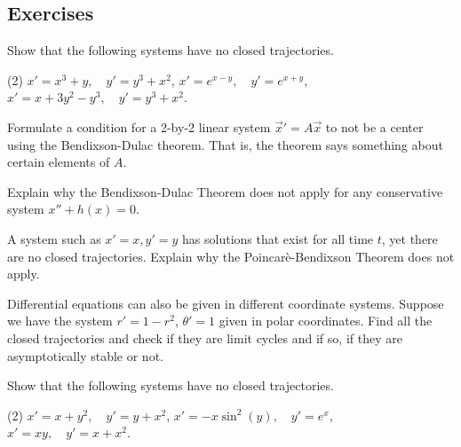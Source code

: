 \subsection{Exercises}

\begin{exercise}
Show that the following systems have no closed trajectories.
\begin{tasks}(2)
\task $x'=x^3+y,\quad y'=y^3+x^2$,
\task $x'=e^{x-y},\quad y'=e^{x+y}$,
\task $x'=x+3y^2-y^3,\quad y'=y^3+x^2$.
\end{tasks}
\end{exercise}

\begin{exercise}
Formulate a condition for a 2-by-2 linear system
${\vec{x}}' = A \vec{x}$ to not be a center using the Bendixson-Dulac theorem.
That is, the theorem says something about certain elements of $A$.
\end{exercise}

\begin{exercise}
Explain why the Bendixson-Dulac Theorem does not apply for any conservative
system $x''+h(x) = 0$.
\end{exercise}

\begin{exercise}
A system such as $x'=x, y'=y$ has solutions that exist for all time $t$,
yet there are no closed trajectories.  Explain
why the Poincar\`e-Bendixson Theorem does not apply.
\end{exercise}

\begin{exercise}
Differential equations can also be given in different coordinate systems.  
Suppose we have the system $r' = 1-r^2$, $\theta' = 1$ given
in polar coordinates.  Find all the closed trajectories and check if they
are limit cycles and if so, if they are asymptotically stable or not.
\end{exercise}


\setcounter{exercise}{100}

\begin{exercise}
Show that the following systems have no closed trajectories.
\begin{tasks}(2)
\task $x'=x+y^2,\quad y'=y+x^2$,
\task $x'=-x\sin^2(y),\quad y'=e^x$,
\task $x'=xy,\quad y'=x+x^2$.
\end{tasks}
\end{exercise}


